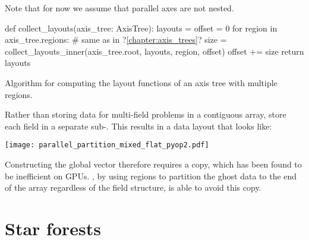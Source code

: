 \documentclass[thesis]{subfiles}
\begin{document}
Note that for now we assume that parallel axes are not nested.

\begin{algorithm}
  \begin{center}
    \begin{minipage}{.9\textwidth}
      \begin{pyalg2}
        def collect_layouts(axis_tree: AxisTree):
          layouts = {}
          offset = 0
          for region in axis_tree.regions:
            # same as in ?\cref{chapter:axis_trees}?
            size = collect_layouts_inner(axis_tree.root, layouts, region, offset)
            offset += size
          return layouts
      \end{pyalg2}
    \end{minipage}
  \end{center}

  \caption{
    Algorithm for computing the layout functions of an axis tree with multiple regions.
  }
  \label{alg:collect_layouts_parallel}
\end{algorithm}




\begin{pyopcompare}
  Rather than storing data for multi-field problems in a contiguous array,   store each field in a separate sub-.
  This results in a data layout that looks like:

  \begin{center}
    \texttt{[image: parallel\_partition\_mixed\_flat\_pyop2.pdf]}
  \end{center}

  Constructing the global vector therefore requires a copy, which has been found to be inefficient on GPUs.
  , by using regions to partition the ghost data to the end of the array regardless of the field structure, is able to avoid this copy.
\end{pyopcompare}

\section{Star forests}
\label{sec:parallel_star_forests}
\end{document}
